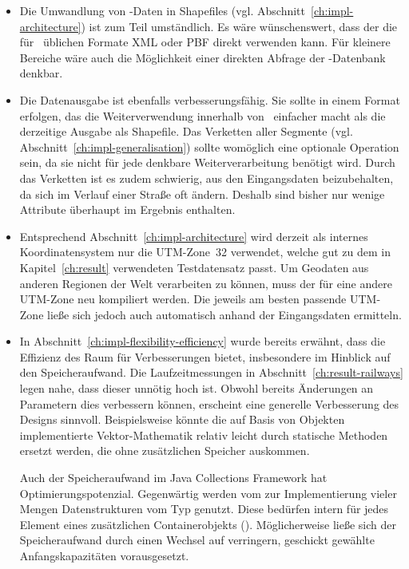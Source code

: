 \documentclass[../main/thesis.tex]{subfiles}
\begin{document}
\begin{itemize}

\item
Die Umwandlung von \osm-Daten in Shapefiles (vgl. Abschnitt~\ref{ch:impl-architecture}) ist zum Teil umständlich.
Es wäre wünschenswert, dass der  die für \osm\ üblichen Formate XML oder PBF direkt verwenden kann.
Für kleinere Bereiche wäre auch die Möglichkeit einer direkten Abfrage der \osm-Datenbank denkbar.

\item
Die Datenausgabe ist ebenfalls verbesserungsfähig.
Sie sollte in einem Format erfolgen, das die Weiterverwendung innerhalb von \osm\ einfacher macht als die derzeitige Ausgabe als Shapefile.
Das Verketten aller Segmente (vgl. Abschnitt~\ref{ch:impl-generalisation}) sollte womöglich eine optionale Operation sein, da sie nicht für jede denkbare Weiterverarbeitung benötigt wird.
Durch das Verketten ist es zudem schwierig,  aus den Eingangsdaten beizubehalten, da sich  im Verlauf einer Straße oft ändern.
Deshalb sind bisher nur wenige Attribute überhaupt im Ergebnis enthalten.

\item
Entsprechend Abschnitt~\ref{ch:impl-architecture} wird derzeit als internes Koordinatensystem nur die UTM-Zone~32 verwendet, welche gut zu dem in Kapitel~\ref{ch:result} verwendeten Testdatensatz passt.
Um Geodaten aus anderen Regionen der Welt verarbeiten zu können, muss der  für eine andere UTM-Zone neu kompiliert werden.
Die jeweils am besten passende UTM-Zone ließe sich jedoch auch automatisch anhand der Eingangsdaten ermitteln.

\item
In Abschnitt~\ref{ch:impl-flexibility-efficiency} wurde bereits erwähnt, dass die Effizienz des  Raum für Verbesserungen bietet, insbesondere im Hinblick auf den Speicheraufwand.
Die Laufzeitmessungen in Abschnitt~\ref{ch:result-railways} legen nahe, dass dieser unnötig hoch ist.
Obwohl bereits Änderungen an Parametern dies verbessern können, erscheint eine generelle Verbesserung des Designs sinnvoll.
Beispielsweise könnte die auf Basis von Objekten implementierte Vektor-Mathematik relativ leicht durch statische Methoden ersetzt werden, die ohne zusätzlichen Speicher auskommen.

Auch der Speicheraufwand im Java Collections Framework hat Optimierungspotenzial.
Gegenwärtig werden vom  zur Implementierung vieler Mengen Datenstrukturen vom Typ  genutzt.
Diese bedürfen intern für jedes Element eines zusätzlichen Containerobjekts ().
Möglicherweise ließe sich der Speicheraufwand durch einen Wechsel auf  verringern, geschickt gewählte Anfangskapazitäten vorausgesetzt.


\end{itemize}
\end{document}

